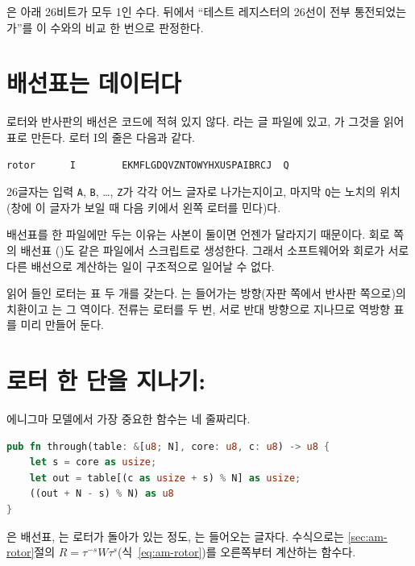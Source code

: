은 아래 26비트가 모두 1인 수다. 뒤에서 ``테스트 레지스터의 26선이 전부 통전되었는가''를 이 수와의
비교 한 번으로 판정한다.

\section{배선표는 데이터다}

로터와 반사판의 배선은 코드에 적혀 있지 않다. 라는 글 파일에 있고,
가 그것을 읽어 표로 만든다. 로터 I의 줄은 다음과 같다.

\begin{lstlisting}[numbers=none]
rotor      I        EKMFLGDQVZNTOWYHXUSPAIBRCJ  Q
\end{lstlisting}

26글자는 입력 \texttt{A}, \texttt{B}, \ldots, \texttt{Z}가 각각 어느 글자로 나가는지이고, 마지막 \texttt{Q}는
노치의 위치(창에 이 글자가 보일 때 다음 키에서 왼쪽 로터를 민다)다.

\Why 배선표를 한 파일에만 두는 이유는 사본이 둘이면 언젠가 달라지기 때문이다. 회로 쪽의 배선표
()도 같은 파일에서 스크립트로 생성한다. 그래서 소프트웨어와 회로가 서로 다른
배선으로 계산하는 일이 구조적으로 일어날 수 없다.

읽어 들인 로터는 표 두 개를 갖는다. 는 들어가는 방향(자판 쪽에서 반사판 쪽으로)의 치환이고
는 그 역이다. 전류는 로터를 두 번, 서로 반대 방향으로 지나므로 역방향 표를 미리 만들어 둔다.

\section{로터 한 단을 지나기: \texorpdfstring{}{through}}\label{sec:through}

에니그마 모델에서 가장 중요한 함수는 네 줄짜리다.

\begin{lstlisting}[language=Rust,caption={\code{enigma.rs}: 회전한 로터를 통과한다.},label={lst:through}]
pub fn through(table: &[u8; N], core: u8, c: u8) -> u8 {
    let s = core as usize;
    let out = table[(c as usize + s) % N] as usize;
    ((out + N - s) % N) as u8
}
\end{lstlisting}

은 배선표, 는 로터가 돌아가 있는 정도, 는 들어오는 글자다. 수식으로는
\ref{sec:am-rotor}절의 $R = \tau^{-s}W\tau^{s}$(식~\eqref{eq:am-rotor})를 오른쪽부터 계산하는 함수다.

